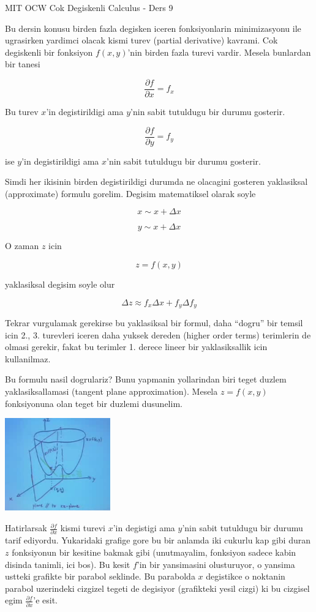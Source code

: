 \documentclass[12pt,fleqn]{article}
\begin{document}
MIT OCW Cok Degiskenli Calculus - Ders 9

Bu dersin konusu birden fazla degisken iceren fonksiyonlarin minimizasyonu
ile ugrasirken yardimci olacak kismi turev (partial derivative)
kavrami. Cok degiskenli bir fonksiyon $f(x,y)$'nin birden fazla turevi
vardir. Mesela bunlardan bir tanesi

\[ \frac{\partial f}{\partial x} = f_x \]

Bu turev $x$'in degistirildigi ama $y$'nin sabit tutuldugu bir durumu
gosterir. 

\[ \frac{\partial f}{\partial y} = f_y \]

ise $y$'in degistirildigi ama $x$'nin sabit tutuldugu bir durumu gosterir.

Simdi her ikisinin birden degistirildigi durumda ne olacagini gosteren
yaklasiksal (approximate) formulu gorelim. Degisim matematiksel olarak
soyle

\[ x \sim x + \Delta x \]

\[ y \sim x + \Delta x \]

O zaman $z$ icin

\[ z = f(x,y) \]

yaklasiksal degisim soyle olur

\[ \Delta z \approx f_x\Delta x + f_y \Delta f_y \]

Tekrar vurgulamak gerekirse bu yaklasiksal bir formul, daha ``dogru'' bir
temsil icin 2., 3. turevleri iceren daha yuksek dereden (higher order
terms) terimlerin de olmasi gerekir, fakat bu terimler 1. derece lineer bir
yaklasiksallik icin kullanilmaz. 

Bu formulu nasil dogrulariz? Bunu yapmanin yollarindan biri teget duzlem
yaklasiksallamasi (tangent plane approximation). Mesela $z = f(x,y)$
fonksiyonuna olan teget bir duzlemi dusunelim.

\includegraphics[height=4cm]{9_1.png}

Hatirlarsak $\frac{\partial f}{\partial x}$ kismi turevi $x$'in degistigi
ama $y$'nin sabit tutuldugu bir durumu tarif ediyordu. Yukaridaki grafige
gore bu bir anlamda iki cukurlu kap gibi duran $z$ fonksiyonun bir kesitine
bakmak gibi (unutmayalim, fonksiyon sadece kabin disinda tanimli, ici
bos). Bu kesit $f$'in bir yansimasini olusturuyor, o yansima ustteki
grafikte bir parabol seklinde. Bu parabolda $x$ degistikce o noktanin
parabol uzerindeki cizgizel tegeti de degisiyor (grafikteki yesil cizgi) ki
bu cizgisel egim $\frac{\partial f}{\partial x}$'e esit. 
\end{document}
